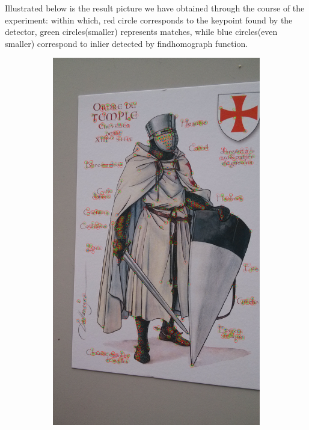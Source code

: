 \documentclass[10pt,conference,compsocconf]{IEEEtran}
\begin{document}
Illustrated below is the result picture we have obtained through the course of the experiment: within which, red circle corresponds to the keypoint found by the detector, green circles(smaller) represents matches, while blue circles(even smaller) correspond to inlier detected by findhomograph function.\\


\begin{figure}[!ht]
        \centering
        \begin{subfigure}[b]{0.15\textwidth}
                \includegraphics[width=\textwidth]{b}

\end{subfigure}
\end{figure}
\end{document}
